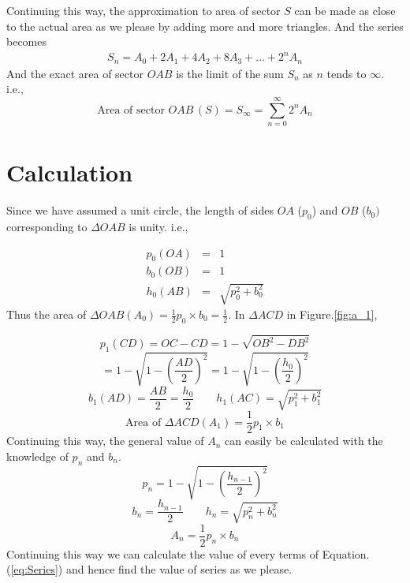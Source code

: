 \documentclass{IEEEtran}
\theoremstyle{definition} \newtheorem{Definition}{Def{\,}inition}
\begin{document}
Continuing this way, the approximation to area of sector $S$ can be made as close to the actual area as we please by adding more and more triangles. And the series becomes
\begin{eqnarray} \label{eq:Series}
S_n = A_0 + 2A_1 + 4A_2 + 8A_3 + ... + 2^{n}A_n
\end{eqnarray}
And the exact area of sector $OAB$ is the limit of the sum $S_n$ as $n$ tends to $\infty$. i.e.,\[\text{Area of sector } OAB\, (S)= S_\infty = \sum_{n = 0}^{\infty} 2^{n}A_n \]
\section{Calculation}
Since we have assumed a unit circle, the length of sides $OA$ ($p_0$) and $OB$ ($b_0)$ corresponding to $\Delta OAB$ is unity. i.e.,

\begin{eqnarray}
p_0 (OA) &=& 1 \nonumber \\
b_0 (OB) &=& 1 \nonumber \\
h_0 (AB) &=& \sqrt{p_0^2+b_0^2} \nonumber
\end{eqnarray}
Thus the area of $\Delta OAB (A_0) = \frac{1}{2}p_0 \times b_0 = \frac{1}{2}$. In $\Delta ACD$ in Figure.\ref{fig:a_1},

\begin{equation}
p_1 (CD) = OC - CD = 1 - \sqrt{OB^2 - DB^2} 
\end{equation}
\begin{equation}
 =   1 - \sqrt{1 - \left(\frac{AD}{2}\right)^2} = 1 - \sqrt{1 - \left(\frac{h_0}{2}\right)^2} \nonumber
\end{equation}
\begin{equation}
b_1 (AD) = \frac{AB}{2} =  \frac{h_0}{2} \qquad 
h_1 (AC) = \sqrt{p_1^2+b_1^2} \nonumber
\end{equation}
\begin{equation}
\text{Area of } \Delta ACD (A_1) = \frac{1}{2}p_1 \times b_1 \nonumber
\end{equation}
Continuing this way, the general  value of $A_n$ can easily be calculated with the knowledge of $p_n$ and $b_n$.
\begin{equation}
p_n = 1 - \sqrt{1 - \left(\frac{h_{n-1}}{2}\right)^2} \nonumber
\end{equation}
\begin{equation}
b_n  =  \frac{h_{n-1}}{2} \qquad 
h_n = \sqrt{p_n^2+b_n^2} \nonumber
\end{equation}
\begin{equation}
A_n = \frac{1}{2}p_n \times b_n \nonumber
\end{equation}
Continuing this way we can calculate the value of every terms of Equation. (\ref{eq:Series}) and hence find the value of series as we please.
\end{document}

